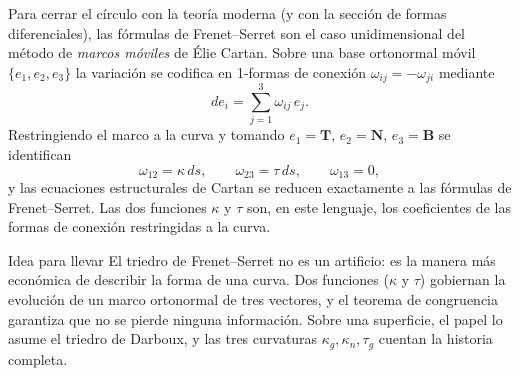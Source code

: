 \documentclass[11pt,letterpaper]{article}
\begin{document}
Para cerrar el círculo con la teoría moderna (y con la sección de formas
diferenciales), las fórmulas de Frenet--Serret son el caso unidimensional
del método de \emph{marcos móviles} de Élie Cartan. Sobre una base
ortonormal móvil $\{e_1,e_2,e_3\}$ la variación se codifica en 1-formas
de conexión $\omega_{ij}=-\omega_{ji}$ mediante
\[
  de_i = \sum_{j=1}^3 \omega_{ij}\,e_j .
\]
Restringiendo el marco a la curva y tomando $e_1=\mathbf{T}$,
$e_2=\mathbf{N}$, $e_3=\mathbf{B}$ se identifican
\[
  \omega_{12} = \kappa\,ds,\qquad
  \omega_{23} = \tau\,ds,\qquad
  \omega_{13} = 0,
\]
y las ecuaciones estructurales de Cartan se reducen exactamente a las
fórmulas de Frenet--Serret. Las dos funciones $\kappa$ y $\tau$ son, en
este lenguaje, los coeficientes de las formas de conexión restringidas a
la curva.

\begin{infobox}[blackmain]{Idea para llevar}
El triedro de Frenet--Serret no es un artificio: es la manera más económica
de describir la forma de una curva. Dos funciones ($\kappa$ y $\tau$)
gobiernan la evolución de un marco ortonormal de tres vectores, y el
teorema de congruencia garantiza que no se pierde ninguna información.
Sobre una superficie, el papel lo asume el triedro de Darboux, y las tres
curvaturas $\kappa_g,\kappa_n,\tau_g$ cuentan la historia completa.
\end{infobox}
\end{document}
